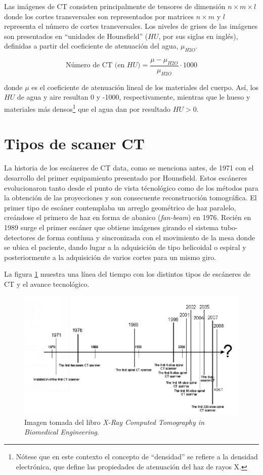 Las imágenes de CT consisten principalmente de tensores de dimensión $n\times m \times l$ donde los cortes transversales son representados por matrices $n\times m$ y $l$ representa el número de cortes transversales. Los niveles de grises de las imágenes son presentados en ``unidades de Hounsfield'' ($HU$, por sus siglas en inglés), definidas a partir del coeficiente de atenuación del agua, $\mu_{H2O}$.

\begin{equation}
 \text{Número de CT (en $HU$)} = \frac{\mu - \mu_{H2O}}{\mu_{H2O}} \cdot 1000
\end{equation}

\noindent
donde $\mu$ es el coeficiente de atenuación lineal de los materiales del cuerpo. Así, los $HU$ de agua y aire resultan 0 y -1000, respectivamente, mientras que le hueso y materiales más densos\footnote{Nótese que en este contexto el concepto de ``densidad'' se refiere a la densidad electrónica, que define las propiedades de atenuación del haz de rayos X.} que el agua dan por resultado $HU > 0$.

\section{Tipos de scaner CT}

La historia de los escáneres de CT data, como se menciona antes, de 1971 con el desarrollo del primer equipamiento presentado por Hounsfield. Estos escáneres evolucionaron tanto desde el punto de vista técnológico como de los métodos para la obtención de las proyecciones y son consecuente reconstrucción tomográfica. El primer tipo de escáner contemplaba un arreglo geométrico de haz paralelo, creándose el primero de haz en forma de abanico (\emph{fan-beam}) en 1976. Recién en 1989 surge el primer escáner que obtiene imágenes girando el sistema tubo-detectores de forma contínua y sincronizada con el movimiento de la mesa donde se ubica el paciente, dando lugar a la adquisición de tipo helicoidal o espiral y posteriormente a la adquisición de varios cortes para un mismo giro.

La figura \ref{fig:10-0.1} muestra una línea del tiempo con los distintos tipos de escáneres de CT y el avance tecnológico.

\begin{figure}
 \centering
 \includegraphics[width=.75\textwidth]{Figuras/fig10-01.png}
 \caption{Imagen tomada del libro \emph{X-Ray Computed Tomography in Biomedical Engineering}.}
 \label{fig:10-0.1}
\end{figure}

